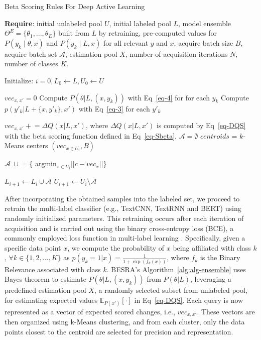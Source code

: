 \documentclass[letterpaper]{article} %
\begin{document}
\begin{algorithm}[tb]\small
\caption{Beta Scoring Rules For Deep Active Learning}
\label{alg:alg-ensemble}

\textbf{Require}: initial unlabeled pool $U$, initial labeled pool $L$, model ensemble $\Theta^E=\{\theta_1,...,\theta_E\}$ built from $L$ by retraining, pre-computed values for $P(y_k \mid \theta,x )$ and $P(y_k \mid L, x )$ for all relevant $y$ and $x$, acquire batch size $B$, acquire batch set $\mathcal{A}$, estimation pool $X$, number of acquisition iterations $N$, number of classes $K$.
\begin{algorithmic}[1]\small
\STATE Initialize: $i=0,L_0\leftarrow L, U_0\leftarrow U$


\STATE  $vec_{x,x'} = 0$
\STATE
Compute $P(\theta|L,(x,y_k))$ with Eq~\eqref{eq-4} for for each $y_k$
\STATE
Compute $p(y'_k|L+\{x,y'_k\},x')$ with Eq~\eqref{eq-3} for each $y'_k$

\ENDFOR
\STATE $vec_{x,x'} +\!\!\!=
\Delta Q(x|L,x')$, where $\Delta Q(x|L,x')$ is computed by Eq~\eqref{eq-DQS} with
the beta scoring function defined in Eq~\eqref{eq-Sbeta}.
\ENDFOR
\STATE $\mathcal{A} = \emptyset$
\STATE $centroids$ = $k$-Means centers $(vec_{x\in U_i}, B)$

\STATE $\mathcal{A}  ~\cup\!\!= \{$ argmin$_{x \in U_i}||c - vec_{x}|| \}$
\ENDFOR

\STATE $L_{i+1}\leftarrow L_i \cup \mathcal{A} $
\STATE $U_{i+1}\leftarrow U_i \setminus \mathcal{A} $

\ENDWHILE
\end{algorithmic}
\end{algorithm}

After incorporating the obtained samples into the labeled set, we proceed to retrain the multi-label classifier (e.g., TextCNN, TextRNN and BERT) using randomly initialized parameters. This retraining occurs after each iteration of acquisition and is carried out using the binary cross-entropy loss (BCE), a commonly employed loss function in multi-label learning \cite{9319440}.
Specifically,
given a specific data point $x$,
we compute the probability of $x$ being affiliated with class $k$,
$\forall k \in \{1, 2, \dots,  K\}$  as
$p(y_k = 1|x) = \frac{1}{1 + \exp(f_k(x))}$,
where $f_k$ is the Binary Relevance associated with class $k$.
BESRA's Algorithm~\ref{alg:alg-ensemble} uses Bayes theorem to estimate $P(\theta|L,(x,y_k))$ from $P(\theta|L)$, leveraging a predefined estimation pool $X$, a randomly selected subset from unlabeled pool, for estimating expected values $\mathbb{E}_{ P(x')}
[\cdot]$ in Eq~\eqref{eq-DQS}.
Each query is now represented as a vector of expected scored changes, i.e.,
$vec_{x,x'}$.
These vectors are then organized using k-Means clustering, and from each cluster, only the data points closest to the centroid are selected for precision and representation.
\end{document}
